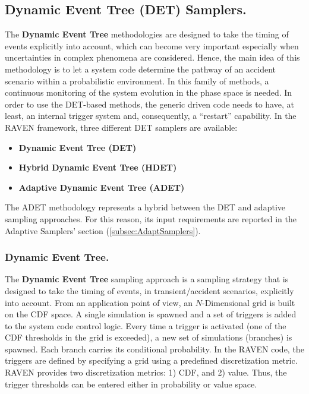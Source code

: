 \subsection{Dynamic Event Tree (DET) Samplers.}
\label{subsec:DETSamplers}
The \textbf{Dynamic Event Tree} methodologies are designed to take the timing of
events explicitly into account, which can become very important especially when
uncertainties in complex phenomena are considered.
%
Hence, the main idea of this methodology is to let a system code determine the
pathway of an accident scenario within a probabilistic environment.
%
In this family of methods, a continuous monitoring of the system evolution in
the phase space is needed.
%
In order to use the DET-based methods, the generic driven code needs to have, at
least, an internal trigger system and, consequently, a ``restart'' capability.
%
In the RAVEN framework, three different DET samplers are available:
\begin{itemize}
\item \textbf{Dynamic Event Tree (DET)}
\item \textbf{Hybrid Dynamic Event Tree (HDET)}
\item \textbf{Adaptive Dynamic Event Tree (ADET)}
\end{itemize}

The ADET methodology represents a hybrid between the DET and adaptive sampling
approaches.
%
For this reason, its input requirements are reported in the Adaptive Samplers'
section (\ref{subsec:AdaptSamplers}).

\subsubsection{Dynamic Event Tree.}
\label{subsubsubsec:DET}
The \textbf{Dynamic Event Tree} sampling approach is a sampling strategy that is
designed to take the timing of events, in transient/accident scenarios,
explicitly into account.
%
From an application point of view, an $N$-Dimensional grid is built on the CDF
space.
%
A single simulation is spawned and a set of triggers is added to the system code
control logic.
%
Every time a trigger is activated (one of the CDF thresholds in the grid is
exceeded), a new set of simulations (branches) is spawned.
%
Each branch carries its conditional probability.
%
In the RAVEN code, the triggers are defined by specifying a grid using a
predefined discretization metric.
%
RAVEN provides two discretization metrics: 1) CDF, and 2) value.
%
Thus, the trigger thresholds can be entered either in probability or value
space.
%

